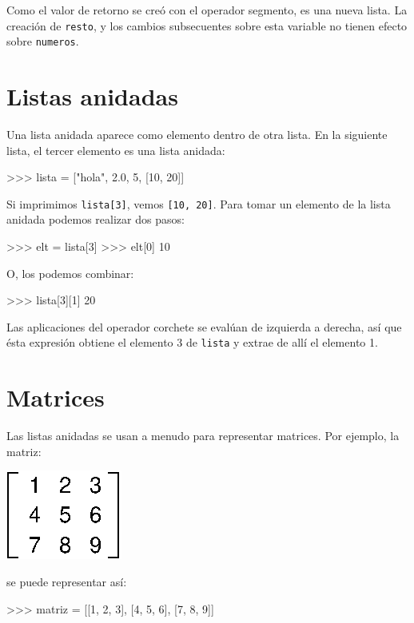 Como el valor de retorno se creó con el operador segmento, es una
nueva lista. La creación de \texttt{resto}, y los cambios subsecuentes
sobre esta variable no tienen efecto sobre \texttt{numeros}.

\section{Listas anidadas}

\label{nested lists}  

Una lista anidada aparece como elemento dentro de otra lista. En la
siguiente lista, el tercer elemento es una lista anidada:
\begin{pyconcode}
>>> lista = ["hola", 2.0, 5, [10, 20]]
\end{pyconcode}

Si imprimimos \texttt{lista{[}3{]}}, vemos \texttt{{[}10, 20{]}}.
Para tomar un elemento de la lista anidada podemos realizar dos pasos:
\begin{pyconcode}
>>> elt = lista[3]
>>> elt[0]
10
\end{pyconcode}
 O, los podemos combinar:
\begin{pyconcode}
>>> lista[3][1]
20
\end{pyconcode}

Las aplicaciones del operador corchete se evalúan de izquierda a derecha,
así que ésta expresión obtiene el elemento 3 de \texttt{lista} y extrae
de allí el elemento 1.

\section{Matrices}

 

Las listas anidadas se usan a menudo para representar matrices. Por
ejemplo, la matriz:

\beforefig \centerline{\includegraphics{illustrations/matrix}}
\afterfig

se puede representar así:
\begin{pyconcode}
>>> matriz = [[1, 2, 3], [4, 5, 6], [7, 8, 9]]
\end{pyconcode}

